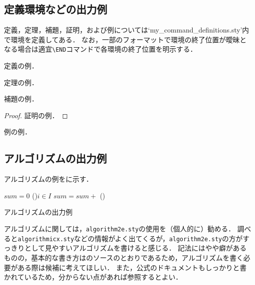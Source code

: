 \subsection{定義環境などの出力例}

定義，定理，補題，証明，および例については`my\_command\_definitions.sty'内で環境を定義してある．
なお，一部のフォーマットで環境の終了位置が曖昧となる場合は適宜\texttt{\textbackslash END}コマンドで各環境の終了位置を明示する．

\begin{definition}\label{def:example}
  定義の例．
  \END
\end{definition}

\begin{theorem}\label{thm:example}
  定理の例．
  \END
\end{theorem}

\begin{lemma}\label{lem:example}
  補題の例．
  \END
\end{lemma}

\begin{proof}
  証明の例．
\end{proof}

\begin{example}\label{eg:example}
  例の例．
  \END
\end{example}



\subsection{アルゴリズムの出力例}

アルゴリズムの例を\Fig{\ref{fig:algo:sample}}に示す．

\begin{algorithm}[t]
  \small
  \DontPrintSemicolon
  $sum = 0$\;
  \ForEach(){$i \in I$}{
    $sum = sum +$ 
  }
  \BlankLine
  \Proc(){}{
  }
  \caption{アルゴリズムの出力例}
  \label{fig:algo:sample}
\end{algorithm}

アルゴリズムに関しては，\texttt{algorithm2e.sty}の使用を（個人的に）勧める．
調べると\texttt{algorithmicx.sty}などの情報がよく出てくるが，\texttt{algorithm2e.sty}の方がすっきりとして見やすいアルゴリズムを書けると感じる．
記法にはやや癖があるものの，基本的な書き方は\Fig{\ref{fig:algo:sample}}のソースのとおりであるため，アルゴリズムを書く必要がある際は候補に考えてほしい．
また，公式のドキュメントもしっかりと書かれているため，分からない点があれば参照するとよい．



